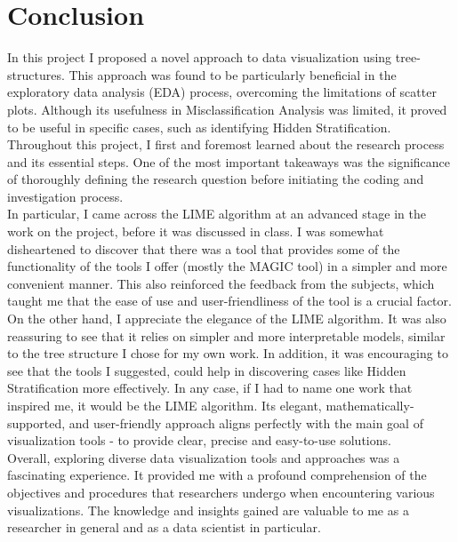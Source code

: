 \documentclass[11pt]{article}
\begin{document}
\section{Conclusion}\label{Conclusion}
In this project I proposed a novel approach to data visualization using tree-structures. This approach was found to be particularly beneficial in the exploratory data analysis (EDA) process, overcoming the limitations of scatter plots. Although its usefulness in Misclassification Analysis was limited, it proved to be useful in specific cases, such as identifying Hidden Stratification.\\
Throughout this project, I first and foremost learned about the research process and its essential steps. One of the most important takeaways was the significance of thoroughly defining the research question before initiating the coding and investigation process.\\
In particular, I came across the LIME algorithm at an advanced stage in the work on the project, before it was discussed in class. I was somewhat disheartened to discover that there was a tool that provides some of the functionality of the tools I offer (mostly the MAGIC tool) in a simpler and more convenient manner. This also reinforced the feedback from the subjects, which taught me that the ease of use and user-friendliness of the tool is a crucial factor. On the other hand, I appreciate the elegance of the LIME algorithm. It was also reassuring to see that it relies on simpler and more interpretable models, similar to the tree structure I chose for my own work. In addition, it was encouraging to see that the tools I suggested, could help in discovering cases like Hidden Stratification more effectively. In any case, if I had to name one work that inspired me, it would be the LIME algorithm. Its elegant, mathematically-supported, and user-friendly approach aligns perfectly with the main goal of visualization tools - to provide clear, precise and easy-to-use solutions.\\
Overall, exploring diverse data visualization tools and approaches was a fascinating experience. It provided me with a profound comprehension of the objectives and procedures that researchers undergo when encountering various visualizations. The knowledge and insights gained are valuable to me as a researcher in general and as a data scientist in particular.




\end{document}
